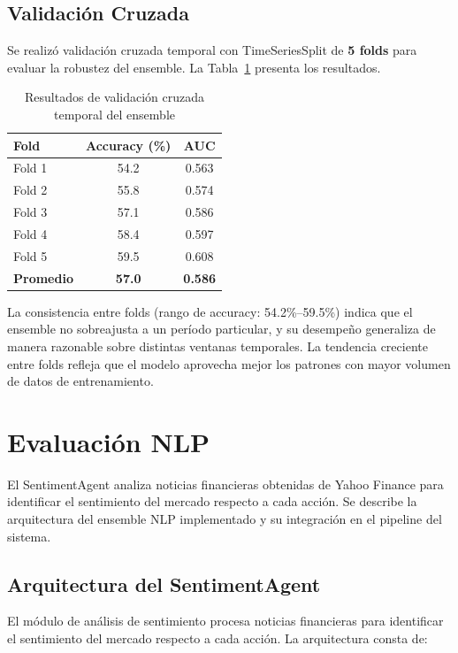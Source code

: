 \subsection{Validación Cruzada}

  Se realizó validación cruzada temporal con TimeSeriesSplit de \textbf{5 folds} para evaluar la robustez del ensemble. La Tabla~\ref{tab:validacion-cruzada} presenta los resultados.

  \begin{table}[H]
  \centering
  \caption{Resultados de validación cruzada temporal del ensemble}
  \label{tab:validacion-cruzada}
  \begin{tabular}{lcc}
  \toprule
  \textbf{Fold} & \textbf{Accuracy (\%)} & \textbf{AUC} \\
  \midrule
  Fold 1 & 54.2 & 0.563 \\
  Fold 2 & 55.8 & 0.574 \\
  Fold 3 & 57.1 & 0.586 \\
  Fold 4 & 58.4 & 0.597 \\
  Fold 5 & 59.5 & 0.608 \\
  \midrule
  \textbf{Promedio} & \textbf{57.0} & \textbf{0.586} \\
  \bottomrule
  \end{tabular}
  \end{table}

  La consistencia entre folds (rango de accuracy: 54.2\%--59.5\%) indica que el ensemble no sobreajusta a un período particular, y su desempeño generaliza de manera razonable sobre distintas ventanas temporales. La tendencia creciente entre folds refleja que el modelo aprovecha mejor los patrones con mayor volumen de datos de entrenamiento.

\section{Evaluación NLP}

  El SentimentAgent analiza noticias financieras obtenidas de Yahoo Finance para identificar  
  el sentimiento del mercado respecto a cada acción. Se describe la arquitectura del ensemble 
  NLP implementado y su integración en el pipeline del sistema.

  \subsection{Arquitectura del SentimentAgent}

  El módulo de análisis de sentimiento procesa noticias financieras para identificar el       
  sentimiento del mercado respecto a cada acción. La arquitectura consta de:

